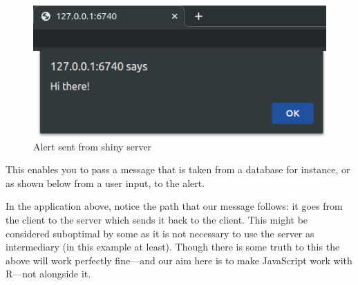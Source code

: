 \documentclass[
]{krantz}
\makeatletter
\newenvironment{Shaded}{\begin{snugshade}}{\end{snugshade}}
\newcommand{\ControlFlowTok}[1]{\textcolor[rgb]{0.27,0.27,0.27}{\textbf{#1}}}
\newcommand{\DataTypeTok}[1]{\textcolor[rgb]{0.27,0.27,0.27}{#1}}
\newcommand{\KeywordTok}[1]{\textcolor[rgb]{0.27,0.27,0.27}{\textbf{#1}}}
\newcommand{\NormalTok}[1]{#1}
\newcommand{\OperatorTok}[1]{\textcolor[rgb]{0.43,0.43,0.43}{\textbf{#1}}}
\newcommand{\StringTok}[1]{\textcolor[rgb]{0.5,0.5,0.5}{#1}}
\newenvironment{kframe}{%
\medskip{}
\setlength{\fboxsep}{.8em}
 \def\at@end@of@kframe{}%
 \ifinner\ifhmode%
  \def\at@end@of@kframe{\end{minipage}}%
  \begin{minipage}{\columnwidth}%
 \fi\fi%
 \def\FrameCommand##1{\hskip\@totalleftmargin \hskip-\fboxsep
 \colorbox{shadecolor}{##1}\hskip-\fboxsep
     \hskip-\linewidth \hskip-\@totalleftmargin \hskip\columnwidth}%
 \MakeFramed {\advance\hsize-\width
   \@totalleftmargin\z@ \linewidth\hsize
   \@setminipage}}%
 {\par\unskip\endMakeFramed%
 \at@end@of@kframe}
\renewenvironment{Shaded}{\begin{kframe}}{\end{kframe}}
\makeatother
\begin{document}
\begin{figure}
\centering
\includegraphics{images/alert-shiny.png}
\caption{Alert sent from shiny server}
\end{figure}

This enables you to pass a message that is taken from a database for instance, or as shown below from a user input, to the alert.

\begin{Shaded}
\end{Shaded}

In the application above, notice the path that our message follows: it goes from the client to the server which sends it back to the client. This might be considered suboptimal by some as it is not necessary to use the server as intermediary (in this example at least). Though there is some truth to this the above will work perfectly fine---and our aim here is to make JavaScript work with R---not alongside it.
\end{document}
